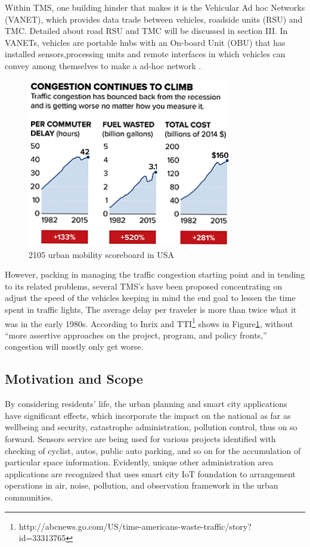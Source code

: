 \documentclass[conference]{IEEEtran}
\begin{document}
  Within TMS, one building hinder that makes it is the Vehicular Ad hoc Networks (VANET), which provides data trade between vehicles, roadside units (RSU) and TMC. Detailed about road RSU and TMC will be discussed in section III. In VANETs, vehicles are portable hubs with an On-board Unit (OBU) that has installed sensors,processing units and remote interfaces in which vehicles can convey among themselves to make a ad-hoc network \cite{2012efficient:villas}.
\begin{figure}[!htb]
\centering
\includegraphics[width=3.5in]{statistics}
\caption{2105 urban mobility scoreboard in USA}
\label{Statistics_in _USA}
\end{figure} 
  However, packing in managing the traffic congestion starting point and in tending to its related problems, several TMS's have been proposed concentrating on adjust the speed of the vehicles keeping in mind the end goal to lessen the time spent in traffic lights, The average delay per traveler is more than twice what it was in the early 1980s. According to Inrix and TTI\footnote{http://abcnews.go.com/US/time-americans-waste-traffic/story?id=33313765} shows in Figure\ref{Statistics_in _USA}, without “more assertive approaches on the project, program, and policy fronts,” congestion will mostly only get worse.
 
 \subsection{Motivation and Scope}
  By considering residents' life, the urban planning and smart city applications have significant effects, which incorporate the impact on the national as far as wellbeing and security, catastrophe administration, pollution control, thus on so forward. Sensors service are being used for various projects identified with checking of cyclist, autos, public auto parking, and so on for the accumulation of particular space information. Evidently, unique other administration area applications are recognized that uses smart city IoT foundation to arrangement operations in air, noise, pollution, and observation framework in the urban communities.
\end{document}
